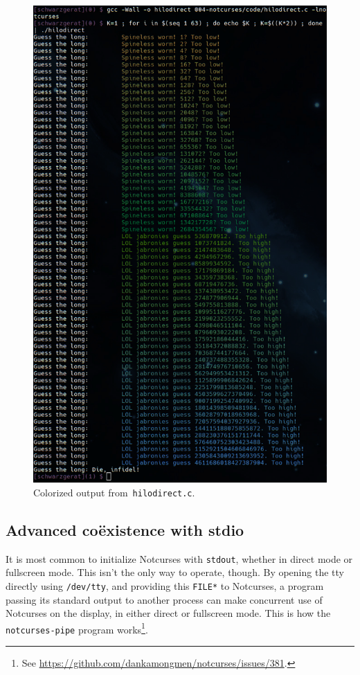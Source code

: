 \documentclass[letterpaper,10pt]{article}
\begin{document}
\begin{figure}[!htbp]
\centering \includegraphics[width=.75\linewidth]{media/hilodirect.png}
\caption{Colorized output from~\texttt{hilodirect.c}.}
\label{fig:colorguess}
\end{figure}

\subsection{Advanced coëxistence with stdio}
It is most common to initialize Notcurses with \texttt{stdout}, whether in
direct mode or fullscreen mode. This isn't the only way to operate, though.
By opening the tty directly using \texttt{/dev/tty}\cite{tty4}, and providing
this \texttt{FILE*} to Notcurses, a program passing its standard output to
another process can make concurrent use of Notcurses on the display, in either
direct or fullscreen mode. This is how the \texttt{notcurses-pipe} program
works\footnote{See \url{https://github.com/dankamongmen/notcurses/issues/381}.}.
\end{document}
